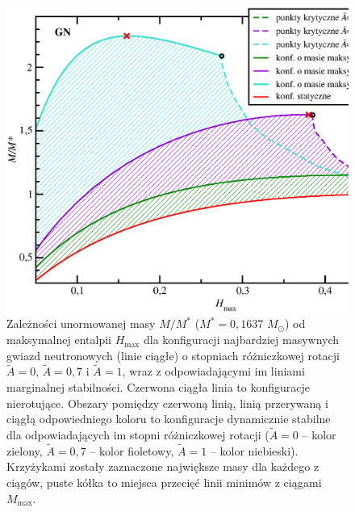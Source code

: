 \documentclass{bachelor_thesis}
\begin{document}
            \begin{figure}[h!]
            \centering
            \includegraphics[scale=.52]{figures/RysLinesPol.eps}
            \caption{Zależności unormowanej masy $M/M^*$ ($M^*=0,1637$ $M_\odot$) od maksymalnej entalpii $H_\textrm{max}$ dla konfiguracji najbardziej masywnych gwiazd neutronowych (linie ciągłe) o stopniach różniczkowej rotacji $\tilde{A}=0$, $\tilde{A}=0,7$ i $\tilde{A}=1$, wraz z odpowiadającymi im liniami marginalnej stabilności. Czerwona ciągła linia to konfiguracje nierotujące. Obszary pomiędzy czerwoną linią, linią przerywaną i ciągłą odpowiedniego koloru to konfiguracje dynamicznie stabilne dla odpowiadających im stopni różniczkowej rotacji ($\tilde{A}=0$ -- kolor zielony, $\tilde{A}=0,7$ -- kolor fioletowy, $\tilde{A}=1$ -- kolor niebieski). Krzyżykami zostały zaznaczone największe masy dla każdego z ciągów, puste kółka to miejsca przecięć linii minimów z ciągami $M_\textrm{max}$.}
            \label{RysLinesPol}
            \end{figure}
\end{document}
